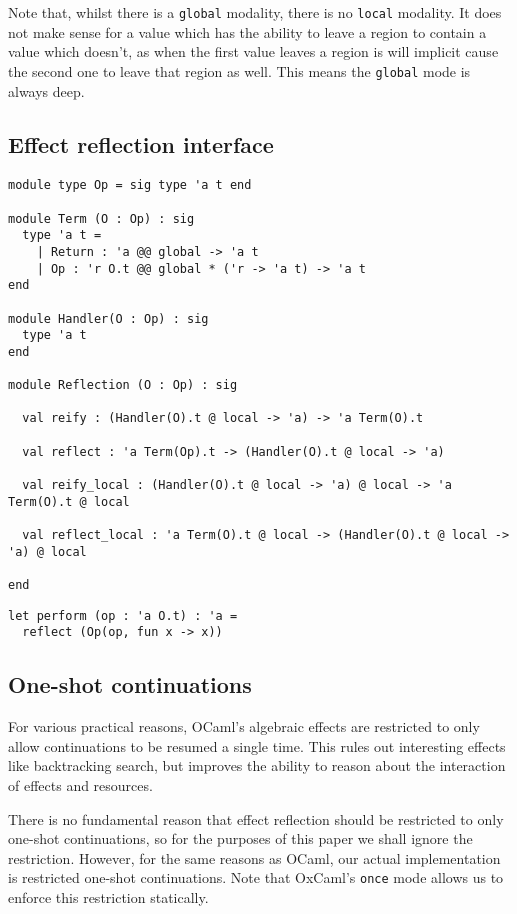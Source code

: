 \documentclass[acmsmall, screen, nonacm]{acmart}
\begin{document}
Note that, whilst there is a \lstinline[style=ocaml]{global} modality,
there is no \lstinline[style=ocaml]{local} modality. It does not make
sense for a value which has the ability to leave a region to contain a
value which doesn't, as when the first value leaves a region is will
implicit cause the second one to leave that region as well. This means
the \lstinline[style=ocaml]{global} mode is always deep.

\subsection{Effect reflection interface}
\label{sec:interface}

\begin{lstlisting}[style=ocaml]
module type Op = sig type 'a t end

module Term (O : Op) : sig
  type 'a t =
    | Return : 'a @@ global -> 'a t
    | Op : 'r O.t @@ global * ('r -> 'a t) -> 'a t
end

module Handler(O : Op) : sig
  type 'a t
end

module Reflection (O : Op) : sig

  val reify : (Handler(O).t @ local -> 'a) -> 'a Term(O).t

  val reflect : 'a Term(Op).t -> (Handler(O).t @ local -> 'a)

  val reify_local : (Handler(O).t @ local -> 'a) @ local -> 'a Term(O).t @ local

  val reflect_local : 'a Term(O).t @ local -> (Handler(O).t @ local -> 'a) @ local

end
\end{lstlisting}

\begin{lstlisting}[style=ocaml]
let perform (op : 'a O.t) : 'a =
  reflect (Op(op, fun x -> x))
\end{lstlisting}

\subsection{One-shot continuations}

For various practical reasons, OCaml's algebraic effects are restricted
to only allow continuations to be resumed a single time. This rules out
interesting effects like backtracking search, but improves the ability
to reason about the interaction of effects and resources.

There is no fundamental reason that effect reflection should be
restricted to only one-shot continuations, so for the purposes of this
paper we shall ignore the restriction. However, for the same reasons as
OCaml, our actual implementation is restricted one-shot
continuations. Note that OxCaml's \lstinline[style=ocaml]{once}
mode\cite{lorenzen2024oxidizing} allows us to enforce this restriction
statically.
\end{document}
